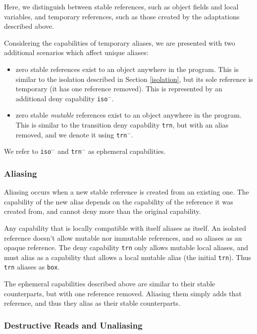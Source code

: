 Here, we distinguish between stable references, such as object fields and local variables, and temporary references, such as those created by the adaptations described above.

Considering the capabilities of temporary aliases, we are presented with two additional scenarios which affect unique aliases:

\begin{itemize}
    \item zero stable references exist to an object anywhere in the program. This is similar to the isolation described in Section \ref{isolation}, but its sole reference is temporary (it has one reference removed). This is represented by an additional deny capability \texttt{iso$^-$}.
    \item zero stable \textit{mutable} references exist to an object anywhere in the program. This is similar to the transition deny capability \texttt{trn}, but with an alias removed, and we denote it using \texttt{trn$^-$}.
\end{itemize}

We refer to \texttt{iso$^-$} and \texttt{trn$^-$} as ephemeral capabilities.

\subsubsection{Aliasing}

Aliasing occurs when a new stable reference is created from an existing one. The capability of the new alias depends on the capability of the reference it was created from, and cannot deny more than the original capability.

Any capability that is locally compatible with itself aliases as itself. An isolated reference doesn't allow mutable nor immutable references, and so aliases as an opaque reference. The deny capability \texttt{trn} only allows mutable local aliases, and must alias as a capability that allows a local mutable alias (the initial \texttt{trn}). Thus \texttt{trn} aliases as \texttt{box}.

The ephemeral capabilities described above are similar to their stable counterparts, but with one reference removed. Aliasing them simply adds that reference, and thus they alias as their stable counterparts.

\subsubsection{Destructive Reads and Unaliasing}

